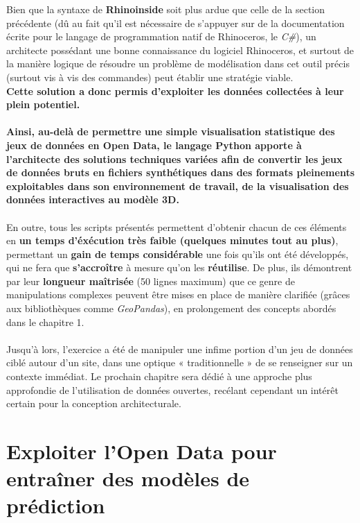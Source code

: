 \documentclass[
  11pt,
  french,
]{article}
\begin{document}
Bien que la syntaxe de \textbf{Rhinoinside} soit plus ardue que celle de
la section précédente (dû au fait qu'il est nécessaire de s'appuyer sur
de la documentation écrite pour le langage de programmation natif de
Rhinoceros, le \emph{C\#}), un architecte possédant une bonne
connaissance du logiciel Rhinoceros, et surtout de la manière logique de
résoudre un problème de modélisation dans cet outil précis (surtout vis
à vis des commandes) peut établir une stratégie viable.\\
\textbf{Cette solution a donc permis d'exploiter les données collectées
à leur plein potentiel.}\\
~\\
\textbf{Ainsi, au-delà de permettre une simple visualisation statistique
des jeux de données en Open Data, le langage Python apporte à
l'architecte des solutions techniques variées afin de convertir les jeux
de données bruts en fichiers synthétiques dans des formats pleinements
exploitables dans son environnement de travail, de la visualisation des
données interactives au modèle 3D.}\\
~\\
En outre, tous les scripts présentés permettent d'obtenir chacun de ces
éléments en \textbf{un temps d'éxécution très faible (quelques minutes
tout au plus)}, permettant un \textbf{gain de temps considérable} une
fois qu'ils ont été développés, qui ne fera que \textbf{s'accroître} à
mesure qu'on les \textbf{réutilise}. De plus, ils démontrent par leur
\textbf{longueur maîtrisée} (50 lignes maximum) que ce genre de
manipulations complexes peuvent être mises en place de manière clarifiée
(grâces aux bibliothèques comme \emph{GeoPandas}), en prolongement des
concepts abordés dans le chapitre 1.\\
~\\
Jusqu'à lors, l'exercice a été de manipuler une infime portion d'un jeu
de données ciblé autour d'un site, dans une optique « traditionnelle »
de se renseigner sur un contexte immédiat. Le prochain chapitre sera
dédié à une approche plus approfondie de l'utilisation de données
ouvertes, recélant cependant un intérêt certain pour la conception
architecturale.

\newpage

\hypertarget{exploiter-lopen-data-pour-entrauxeener-des-moduxe8les-de-pruxe9diction}{%
\section{Exploiter l'Open Data pour entraîner des modèles de
prédiction}\label{exploiter-lopen-data-pour-entrauxeener-des-moduxe8les-de-pruxe9diction}}
\end{document}
